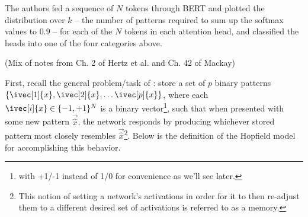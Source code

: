 \documentclass[11pt]{article}
\begin{document}
The authors fed a sequence of $N$ tokens through BERT and plotted the distribution over $k$ -- the number of patterns required to sum up the softmax values to $0.9$ -- for each of the $N$ tokens in each attention head, and classified the heads into one of the four categories above. 


\clearpage
{}
\myspace

(Mix of notes from Ch. 2 of Hertz et al. and  Ch. 42 of Mackay)

First, recall the general problem/task of : store a set of $p$ binary patterns $\{ \ivec[1]{x}, \ivec[2]{x}, \ldots \ivec[p]{x}\}$, where each $\ivec[i]{x} \in \{-1, +1\}^{N}$ is a binary vector\footnote{with +1/-1 instead of 1/0 for convenience as we'll see later.}, such that when presented with some new pattern $\vec{\hat x}$, the network responds by producing whichever stored pattern most closely resembles $\vec{\hat x}$\footnote{This notion of setting a network's activations in order for it to then re-adjust them to a different desired set of activations is referred to as a  memory.}. Below is the definition of the Hopfield model for accomplishing this behavior. 
\end{document}
